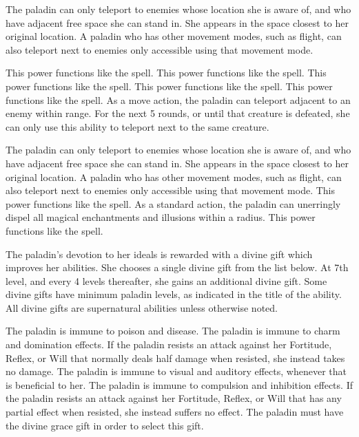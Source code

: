 The paladin can only teleport to enemies whose location she is aware of, and who have adjacent free space she can stand in.
She appears in the space closest to her original location.
A paladin who has other movement modes, such as flight, can also teleport next to enemies only accessible using that movement mode.

 This power functions like the 
spell.
 This power functions like the 
spell.
 This power functions like the 
spell.
 This power functions like the 
spell.
 This power functions like the 
spell.
As a move action, the paladin can teleport adjacent to an enemy within \rngmed range.
For the next 5 rounds, or until that creature is defeated, she can only use this ability to teleport next to the same creature.

The paladin can only teleport to enemies whose location she is aware of, and who have adjacent free space she can stand in.
She appears in the space closest to her original location.
A paladin who has other movement modes, such as flight, can also teleport next to enemies only accessible using that movement mode.
 This power functions like the 
spell.
As a standard action, the paladin can unerringly dispel all magical enchantments and illusions within a \arealarge radius.
 This power functions like the 
spell.

The paladin's devotion to her ideals is rewarded with a divine gift which improves her abilities.
She chooses a single divine gift from the list below.
At 7th level, and every 4 levels thereafter, she gains an additional divine gift.
Some divine gifts have minimum paladin levels, as indicated in the title of the ability.
All divine gifts are supernatural abilities unless otherwise noted.

The paladin is immune to poison and disease.
The paladin is immune to charm and domination effects.
If the paladin resists an attack against her Fortitude, Reflex, or Will that normally deals half damage when resisted, she instead takes no damage.
The paladin is immune to visual and auditory effects, whenever that is beneficial to her.
The paladin is immune to compulsion and inhibition effects.
If the paladin resists an attack against her Fortitude, Reflex, or Will that has any partial effect when resisted, she instead suffers no effect.
The paladin must have the divine grace gift in order to select this gift.

